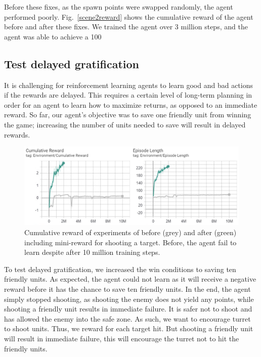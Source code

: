 \documentclass[conference]{IEEEtran}
\begin{document}
Before these fixes, as the spawn points were swapped randomly, the agent performed poorly. Fig.~\ref{scene2reward} shows the cumulative reward of the agent before and after these fixes. We trained the agent over 3 million steps, and the agent was able to achieve a 100%

\subsection{Test delayed gratification}

It is challenging for reinforcement learning agents to learn good and bad actions if the rewards are delayed. This requires a certain level of long-term planning in order for an agent to learn how to maximize returns, as opposed to an immediate reward. So far, our agent's objective was to save one friendly unit from winning the game; increasing the number of units needed to save will result in delayed rewards.

\begin{figure}[ht]
\centerline{\includegraphics[width=1\textwidth]{assets/delayed_gratification}}
\caption{Cumulative reward of experiments of before (grey) and after (green) including mini-reward for shooting a target. Before, the agent fail to learn despite after 10 million training steps.}
\label{delayed_gratification}
\end{figure}

To test delayed gratification, we increased the win conditions to saving ten friendly units. As expected, the agent could not learn as it will receive a negative reward before it has the chance to save ten friendly units. In the end, the agent simply stopped shooting, as shooting the enemy does not yield any points, while shooting a friendly unit results in immediate failure. It is safer not to shoot and has allowed the enemy into the safe zone. As such, we want to encourage turret to shoot units. Thus, we reward for each target hit. But shooting a friendly unit will result in immediate failure, this will encourage the turret not to hit the friendly units. 
\end{document}
